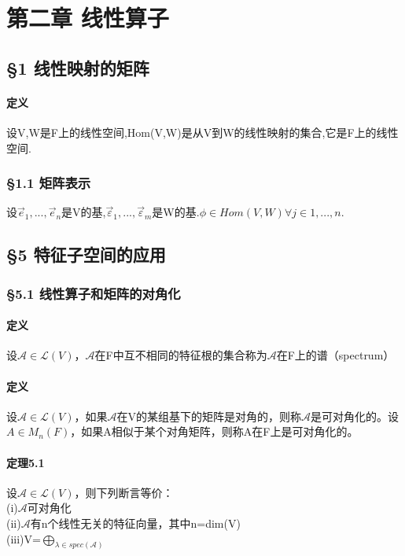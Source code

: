 \documentclass{ctexart}
\begin{document}
\section{第二章 线性算子}

\subsection{§1 线性映射的矩阵}

\paragraph{定义}
设V,W是F上的线性空间,Hom(V,W)是从V到W的线性映射的集合,它是F上的线性空间.

\subsubsection{§1.1 矩阵表示}

设$\vec{e}_{1},...,\vec{e}_{n}$是V的基,$\vec{\varepsilon}_{1},...,\vec{\varepsilon}_{m}$是W的基.$\phi  \in Hom(V,W)    \forall j \in 1,...,n$. 

\subsection{§5 特征子空间的应用}

\subsubsection{§5.1 线性算子和矩阵的对角化}

\paragraph{定义}
设$\mathcal{A}\in\mathcal{L}(V)$，$\mathcal{A}$在F中互不相同的特征根的集合称为$\mathcal{A}$在F上的谱（spectrum）

\paragraph{定义}
设$\mathcal{A}\in\mathcal{L}(V)$，如果$\mathcal{A}$在V的某组基下的矩阵是对角的，则称$\mathcal{A}$是可对角化的。设$A \in M_{n}(F)$，如果A相似于某个对角矩阵，则称A在F上是可对角化的。

\paragraph{定理5.1}
设$\mathcal{A}\in \mathcal{L}(V)$，则下列断言等价：\\
(i)$\mathcal{A}$可对角化\\
(ii)$\mathcal{A}$有n个线性无关的特征向量，其中n=dim(V)\\
(iii)V=$\bigoplus_{\lambda \in spec(\mathcal{A})}$\\
\end{document}

